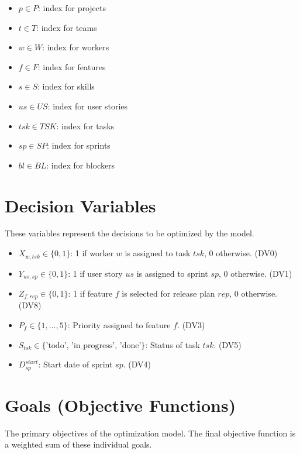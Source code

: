 \documentclass{article}
\begin{document}
\begin{itemize}
    \item $p \in P$: index for projects
    \item $t \in T$: index for teams
    \item $w \in W$: index for workers
    \item $f \in F$: index for features
    \item $s \in S$: index for skills
    \item $us \in US$: index for user stories
    \item $tsk \in TSK$: index for tasks
    \item $sp \in SP$: index for sprints
    \item $bl \in BL$: index for blockers
\end{itemize}

\section{Decision Variables}
These variables represent the decisions to be optimized by the model.

\begin{itemize}
    \item $X_{w,tsk} \in \{0, 1\}$: 1 if worker $w$ is assigned to task $tsk$, 0 otherwise. (DV0)
    \item $Y_{us,sp} \in \{0, 1\}$: 1 if user story $us$ is assigned to sprint $sp$, 0 otherwise. (DV1)
    \item $Z_{f,rep} \in \{0, 1\}$: 1 if feature $f$ is selected for release plan $rep$, 0 otherwise. (DV8)
    \item $P_{f} \in \{1, ..., 5\}$: Priority assigned to feature $f$. (DV3)
    \item $S_{tsk} \in \{\text{'todo', 'in\_progress', 'done'}\}$: Status of task $tsk$. (DV5)
    \item $D_{sp}^{start}$: Start date of sprint $sp$. (DV4)
\end{itemize}

\section{Goals (Objective Functions)}
The primary objectives of the optimization model. The final objective function is a weighted sum of these individual goals.
\end{document}
